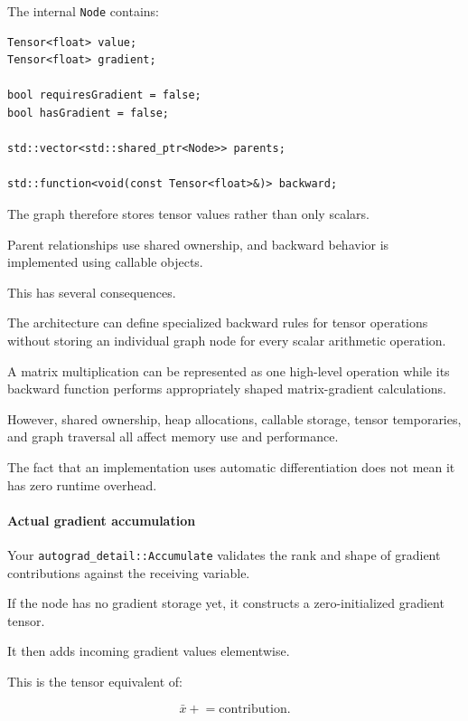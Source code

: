 \hypertarget{02-foundations-ii-ch022-graph-representation}{}

The internal \texttt{Node} contains:

\begin{verbatim}
Tensor<float> value;
Tensor<float> gradient;

bool requiresGradient = false;
bool hasGradient = false;

std::vector<std::shared_ptr<Node>> parents;

std::function<void(const Tensor<float>&)> backward;
\end{verbatim}

The graph therefore stores tensor values rather than only scalars.

Parent relationships use shared ownership, and backward behavior is implemented using callable objects.

This has several consequences.

The architecture can define specialized backward rules for tensor operations without storing an individual graph node for every scalar arithmetic operation.

A matrix multiplication can be represented as one high-level operation while its backward function performs appropriately shaped matrix-gradient calculations.

However, shared ownership, heap allocations, callable storage, tensor temporaries, and graph traversal all affect memory use and performance.

The fact that an implementation uses automatic differentiation does not mean it has zero runtime overhead.

\paragraph{Actual gradient accumulation}\label{02-foundations-ii-ch022-actual-gradient-accumulation}

\hypertarget{02-foundations-ii-ch022-actual-gradient-accumulation}{}

Your \texttt{autograd\_detail::Accumulate} validates the rank and shape of gradient contributions against the receiving variable.

If the node has no gradient storage yet, it constructs a zero-initialized gradient tensor.

It then adds incoming gradient values elementwise.

This is the tensor equivalent of:

\[
\bar x\mathrel{+}=\text{contribution}.
\]

